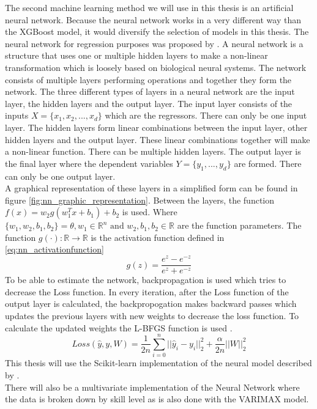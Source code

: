 The second machine learning method we will use in this thesis is an artificial neural network. Because the neural network works in a very different way than the XGBoost model, it would diversify the selection of models in this thesis. The neural network for regression purposes was proposed by \cite{Specht1991ANetwork}. A neural network is a structure that uses one or multiple hidden layers to make a non-linear transformation which is loosely based on biological neural systems. The network consists of multiple layers performing operations and together they form the network. The three different types of layers in a neural network are the input layer, the hidden layers and the output layer. The input layer consists of the inputs $X = \{x_1, x_2, ..., x_d\}$ which are the regressors. There can only be one input layer. The hidden layers form linear combinations between the input layer, other hidden layers and the output layer. These linear combinations together will make a non-linear function. There can be multiple hidden layers. The output layer is the final layer where the dependent variables $Y = \{y_1, ..., y_d\}$ are formed. There can only be one output layer.\\

A graphical representation of these layers in a simplified form can be found in figure \eqref{fig:nn_graphic_representation}. Between the layers, the function $f(x) = w_2 g(w_1^T x + b_1) + b_2$ is used. Where $\{w_1, w_2, b_1, b_2\} = \theta, w_1 \in \mathbb{R}^n \text{ and } w_2, b_1, b_2 \in \mathbb{R}$ are the function parameters. The function $g(\cdot): \mathbb{R} \to \mathbb{R}$ is the activation function defined in \eqref{eq:nn_activationfunction}
\begin{equation}
\label{eq:nn_activationfunction}
    g(z) = \frac{e^z - e^{-z}}{e^z + e^{-z}}
\end{equation}
To be able to estimate the network, backpropagation is used which tries to decrease the Loss function. In every iteration, after the Loss function of the output layer is calculated, the backpropogation makes backward passes which updates the previous layers with new weights to decrease the loss function. To calculate the updated weights the L-BFGS function is used \citep{Liu1989OnOptimalization}.
\begin{equation}
    Loss(\hat{y}, y, W) = \frac{1}{2n} \sum\limits_{i=0}^n ||\hat{y}_i - y_i||^2_2 + \frac{\alpha}{2n} ||W||^2_2
\end{equation}
This thesis will use the Scikit-learn implementation of the neural model described by \cite{Pedregosa2011Scikit-learn:Python}.\\

There will also be a multivariate implementation of the Neural Network where the data is broken down by skill level as is also done with the VARIMAX model. 